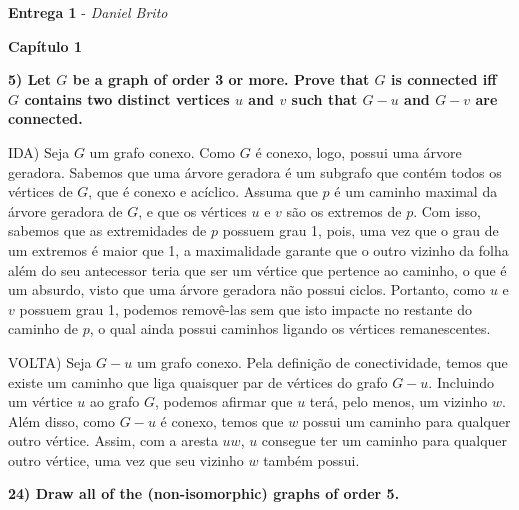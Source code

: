 \documentclass[]{article}
\begin{document}
\begin{center}
  \Large\textbf{Entrega 1} - \Large\textit{Daniel Brito}
\end{center}

\begin{center}
  \Large\textbf{Capítulo 1}
\end{center}

\noindent \textbf{5) Let $G$ be a graph of order 3 or more. Prove that $G$ is connected iff $G$ contains two distinct vertices $u$ and $v$ such that $G-u$ and $G-v$ are connected.}

IDA) Seja $G$ um grafo conexo. Como $G$ é conexo, logo, possui uma árvore geradora. Sabemos que uma árvore geradora é um subgrafo que contém todos os vértices de $G$, que é conexo e acíclico. Assuma que $p$ é um caminho maximal da árvore geradora de $G$, e que os vértices $u$ e $v$ são os extremos de $p$. Com isso, sabemos que as extremidades de $p$ possuem grau 1, pois, uma vez que o grau de um extremos é maior que 1, a maximalidade garante que o outro vizinho da folha além do seu antecessor teria que ser um vértice que pertence ao caminho, o que é um absurdo, visto que uma árvore geradora não possui ciclos. Portanto, como $u$ e $v$ possuem grau 1, podemos removê-las sem que isto impacte no restante do caminho de $p$, o qual ainda possui caminhos ligando os vértices remanescentes.

VOLTA) Seja $G-u$ um grafo conexo. Pela definição de conectividade, temos que existe um caminho que liga quaisquer par de vértices do grafo $G-u$. Incluindo um vértice $u$ ao grafo $G$, podemos afirmar que $u$ terá, pelo menos, um vizinho $w$. Além disso, como $G-u$ é conexo, temos que $w$ possui um caminho para qualquer outro vértice. Assim, com a aresta $uw$, $u$ consegue ter um caminho para qualquer outro vértice, uma vez que seu vizinho $w$ também possui.

\newpage

\noindent \textbf{24) Draw all of the (non-isomorphic) graphs of order 5.}
\end{document}
